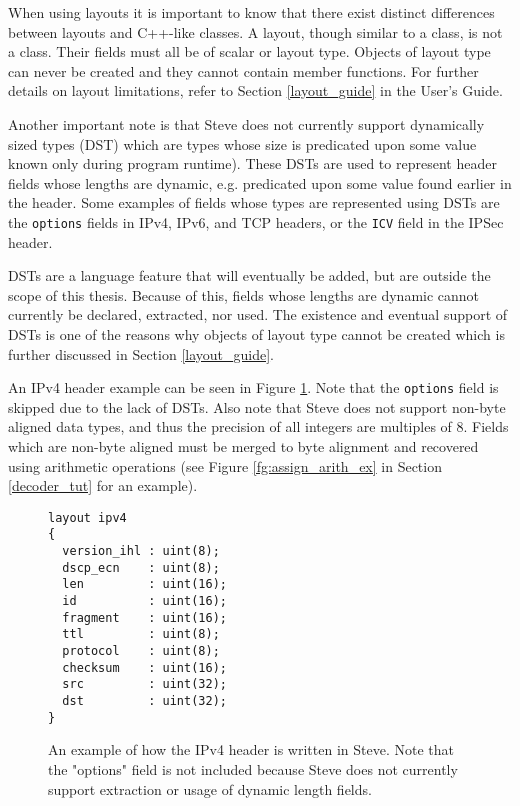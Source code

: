 When using layouts it is important to know that there exist distinct differences between layouts and C++-like classes. A layout, though similar to a class, is not a class. Their fields must all be of scalar or layout type. Objects of layout type can never be created and they cannot contain member functions. For further details on layout limitations, refer to Section \ref{layout_guide} in the User's Guide.

Another important note is that Steve does not currently support dynamically sized types (DST) which are types whose size is predicated upon some value known only during program runtime). These DSTs are used to represent header fields whose lengths are dynamic, e.g. predicated upon some value found earlier in the header. Some examples of fields whose types are represented using DSTs are the \texttt{options} fields in IPv4, IPv6, and TCP headers, or the \texttt{ICV} field in the IPSec header.

DSTs are a language feature that will eventually be added, but are outside the scope of this thesis. Because of this, fields whose lengths are dynamic cannot currently be declared, extracted, nor used. The existence and eventual support of DSTs is one of the reasons why objects of layout type cannot be created which is further discussed in Section \ref{layout_guide}.

An IPv4 header example can be seen in Figure \ref{fg:ipv4_layout_ex}. Note that the \texttt{options} field is skipped due to the lack of DSTs. Also note that Steve does not support non-byte aligned data types, and thus the precision of all integers are multiples of 8. Fields which are non-byte aligned must be merged to byte alignment and recovered using arithmetic operations (see Figure \ref{fg:assign_arith_ex} in Section \ref{decoder_tut} for an example). 

\begin{figure}[ht]
\begin{lstlisting}
layout ipv4
{
  version_ihl : uint(8);
  dscp_ecn    : uint(8);
  len         : uint(16);
  id          : uint(16);
  fragment    : uint(16);
  ttl         : uint(8);
  protocol    : uint(8);
  checksum    : uint(16);
  src         : uint(32);
  dst         : uint(32);
}
\end{lstlisting}
\caption{An example of how the IPv4 header is written in Steve. Note that the "options" field is not included because Steve does not currently support extraction or usage of dynamic length fields.}
\label{fg:ipv4_layout_ex}
\end{figure}

